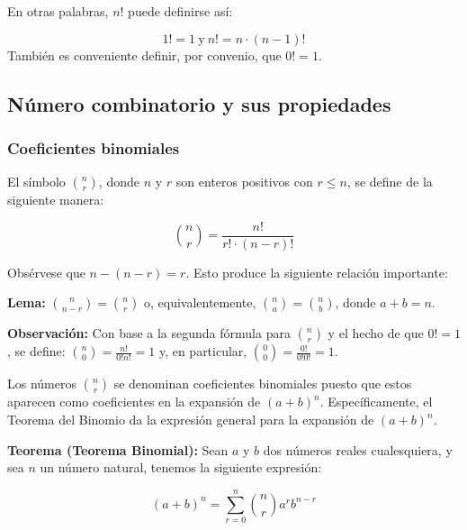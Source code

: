 \documentclass[12pt]{article}
\theoremstyle{definition}
\theoremstyle{plain}
\theoremstyle{plain}
\theoremstyle{definition}
\begin{document}
        En otras palabras, \(n!\) puede definirse así:

        \begin{equation*}
            1! = 1\ \text{y}\ n! = n \cdot (n-1)!
        \end{equation*}
        También es conveniente definir, por convenio, que \(0! = 1\).


    \subsection{Número combinatorio y sus propiedades}
        \subsubsection{Coeficientes binomiales}

            El símbolo \(\binom{n}{r}\), donde \(n\) y \(r\) son enteros positivos con \(r \leq n\), se define de la siguiente manera:

            \begin{equation*}
                \binom{n}{r} = \frac{n!}{r! \cdot (n-r)!}
            \end{equation*}

            Obsérvese que \(n-(n-r) = r\). Esto produce la siguiente relación importante:

            \textbf{Lema:}
            \(\binom{n}{n-r} = \binom{n}{r}\) o, equivalentemente, \(\binom{n}{a} = \binom{n}{b}\), donde \(a+b = n\).

            \textbf{Observación:}
            Con base a la segunda fórmula para \(\binom{n}{r}\) y el hecho de que \(0! = 1\), se define: \(\binom{n}{0} = \frac{n!}{0!n!} = 1\) y, en particular, \(\binom{0}{0} = \frac{0!}{0!0!} = 1\).

            Los números \(\binom{n}{r}\) se denominan coeficientes binomiales puesto que estos aparecen como coeficientes en la expansión de \((a+b)^n\). Específicamente, el Teorema del Binomio da la expresión general para la expansión de \((a+b)^n\).

            \textbf{Teorema (Teorema Binomial):}
            Sean \(a\) y \(b\) dos números reales cualesquiera, y sea \(n\) un número natural, tenemos la siguiente expresión:

            \begin{equation*}
                (a+b)^n = \sum_{r=0}^{n} \binom{n}{r} a^rb^{n-r}
            \end{equation*}
\end{document}
